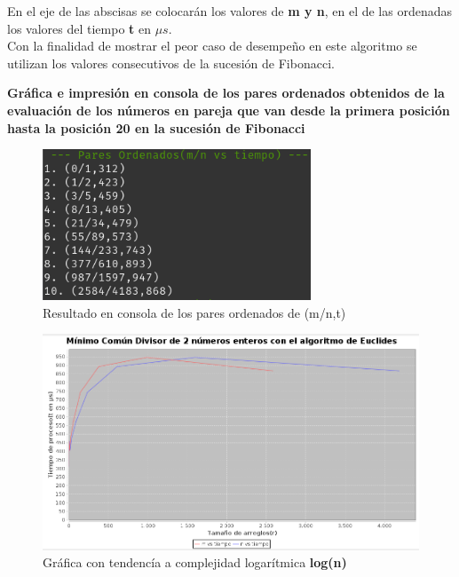 \documentclass{report}
\begin{document}
            En el eje de las abscisas se colocarán los valores de \textbf{m y n}, en el de las ordenadas los valores del tiempo \textbf{t} en $\mu s$. \\
            
            Con la finalidad de mostrar el peor caso de desempeño en este algoritmo se utilizan los valores consecutivos de la sucesión de Fibonacci.
            
            \begin{center}
                \textbf{Gráfica e impresión en consola de los pares ordenados obtenidos de la evaluación de los números en pareja que van desde la primera posición hasta la posición 20 en la sucesión de Fibonacci}
                
            \begin{figure}[!h]
            	\centering
            	\includegraphics[width=8cm]{Imagenes/MCD-R-2.png}
                \caption{Resultado en consola de los pares ordenados de (m/n,t)}
            \end{figure}
            
            \begin{figure}[!h]
            	\centering
            	\includegraphics[width=13cm]{Imagenes/MCD-G-2.png}
                \caption{Gráfica con tendencía a complejidad logarítmica \textbf{log(n)}}
            \end{figure}
            

\end{center}
\end{document}
